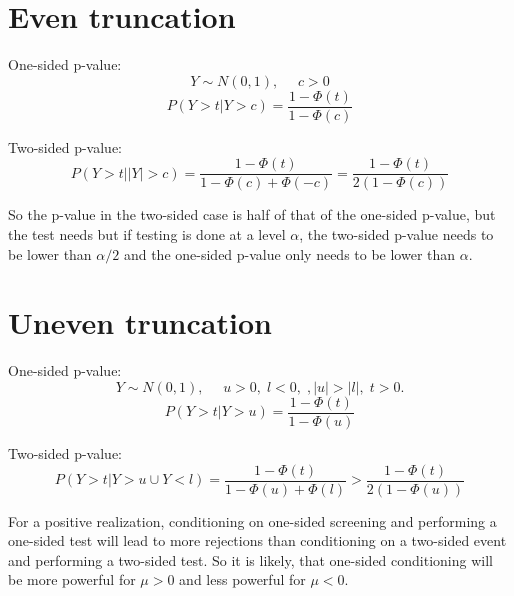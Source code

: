 \documentclass{article}
\begin{document}
\section{Even truncation}
One-sided p-value:
$$
Y \sim N(0, 1), \;\;\;\;\ c >0
$$$$
P(Y > t | Y > c) = \frac{1 - \Phi(t)}{1 - \Phi(c)}
$$

Two-sided p-value:
$$
P(Y > t | |Y| > c) = \frac{1 - \Phi(t)}{1 - \Phi(c) + \Phi(-c)} = \frac{1 - \Phi(t)}{2(1 - \Phi(c))}
$$

So the p-value in the two-sided case is half of that of the one-sided p-value, but the test needs but if testing is done at a level $\alpha$, the two-sided p-value needs to be lower than $\alpha/2$ and the one-sided p-value only needs to be lower than $\alpha$.


\section{Uneven truncation}
One-sided p-value:
$$
Y \sim N(0, 1), \;\;\;\;\ u >0, \; l  < 0, \; , |u| > |l|, \; t > 0.
$$$$
P(Y > t | Y > u) = \frac{1 - \Phi(t)}{1 - \Phi(u)}
$$

Two-sided p-value:
$$
P(Y > t | Y > u \cup Y < l) = \frac{1 - \Phi(t)}{1 - \Phi(u) + \Phi(l)} > \frac{1 - \Phi(t)}{2(1 - \Phi(u))}
$$

For a positive realization, conditioning on one-sided screening and performing a one-sided test will lead to more rejections than conditioning on a two-sided event and performing a two-sided test. So it is likely, that one-sided conditioning will be more powerful for $\mu > 0$ and less powerful for $\mu < 0$. 
\end{document}
